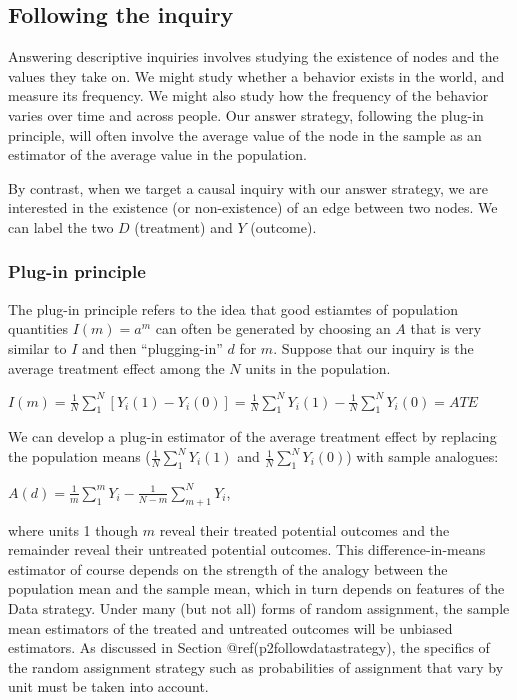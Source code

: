 \documentclass[
]{article}
\begin{document}
\hypertarget{following-the-inquiry}{%
\subsection{Following the inquiry}\label{following-the-inquiry}}

Answering descriptive inquiries involves studying the existence of nodes
and the values they take on. We might study whether a behavior exists in
the world, and measure its frequency. We might also study how the
frequency of the behavior varies over time and across people. Our answer
strategy, following the plug-in principle, will often involve the
average value of the node in the sample as an estimator of the average
value in the population.

By contrast, when we target a causal inquiry with our answer strategy,
we are interested in the existence (or non-existence) of an edge between
two nodes. We can label the two \(D\) (treatment) and \(Y\) (outcome).

\hypertarget{plug-in-principle}{%
\subsubsection{Plug-in principle}\label{plug-in-principle}}

The plug-in principle refers to the idea that good estiamtes of
population quantities \(I(m) = a^m\) can often be generated by choosing
an \(A\) that is very similar to \(I\) and then ``plugging-in'' \(d\)
for \(m\). Suppose that our inquiry is the average treatment effect
among the \(N\) units in the population.

\(I(m) = \frac{1}{N}\sum_1^N[Y_i(1) - Y_i(0)] = \frac{1}{N}\sum_1^NY_i(1) - \frac{1}{N}\sum_1^NY_i(0) = ATE\)

We can develop a plug-in estimator of the average treatment effect by
replacing the population means (\(\frac{1}{N}\sum_1^NY_i(1)\) and
\(\frac{1}{N}\sum_1^NY_i(0)\)) with sample analogues:

\(A(d) = \frac{1}{m}\sum_1^m{Y_i} - \frac{1}{N - m}\sum_{m+1}^N{Y_i}\),

where units 1 though \(m\) reveal their treated potential outcomes and
the remainder reveal their untreated potential outcomes. This
difference-in-means estimator of course depends on the strength of the
analogy between the population mean and the sample mean, which in turn
depends on features of the Data strategy. Under many (but not all) forms
of random assignment, the sample mean estimators of the treated and
untreated outcomes will be unbiased estimators. As discussed in Section
@ref(p2followdatastrategy), the specifics of the random assignment
strategy such as probabilities of assignment that vary by unit must be
taken into account.
\end{document}
